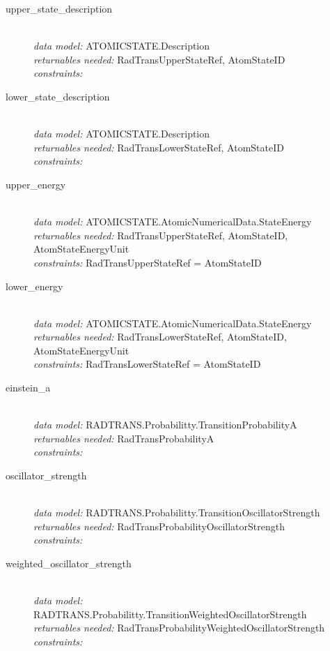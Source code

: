 \documentclass[11pt,a4paper]{ivoa}
\begin{document}
\begin{description}
	\item [upper\_state\_description]\hfill\\
	\textit{data model:} ATOMICSTATE.Description\\
	\textit{returnables needed:} RadTransUpperStateRef, AtomStateID\\
	\textit{constraints:}  

\item [lower\_state\_description]\hfill\\
	\textit{data model:} ATOMICSTATE.Description\\
	\textit{returnables needed:} RadTransLowerStateRef, AtomStateID\\
	\textit{constraints:}  

\item [upper\_energy]\hfill\\
	\textit{data model:} ATOMICSTATE.AtomicNumericalData.StateEnergy\\
	\textit{returnables needed:} RadTransUpperStateRef, AtomStateID, AtomStateEnergyUnit\\
	\textit{constraints:}  RadTransUpperStateRef = AtomStateID

\item [lower\_energy]\hfill\\
	\textit{data model:} ATOMICSTATE.AtomicNumericalData.StateEnergy\\
	\textit{returnables needed:} RadTransLowerStateRef, AtomStateID, AtomStateEnergyUnit\\
	\textit{constraints:}  RadTransLowerStateRef = AtomStateID

\item [einstein\_a]\hfill\\
	\textit{data model:}  RADTRANS.Probabilitty.TransitionProbabilityA\\
	\textit{returnables needed:} RadTransProbabilityA\\
	\textit{constraints:}

\item [oscillator\_strength]\hfill\\
	\textit{data model:}  RADTRANS.Probabilitty.TransitionOscillatorStrength\\
	\textit{returnables needed:} RadTransProbabilityOscillatorStrength\\
    \textit{constraints:}

\item [weighted\_oscillator\_strength]\hfill\\
	\textit{data model:}  RADTRANS.Probabilitty.TransitionWeightedOscillatorStrength\\
	\textit{returnables needed:} RadTransProbabilityWeightedOscillatorStrength\\
    \textit{constraints:}


\end{description}
\end{document}
